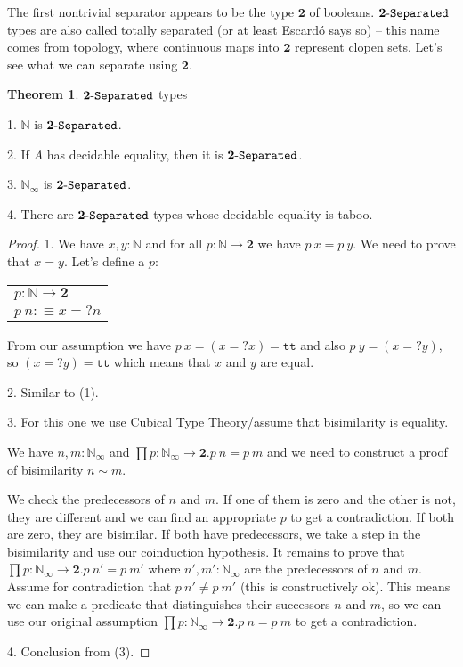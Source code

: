 \documentclass[11pt]{article}
\theoremstyle{definition}
\newtheorem{theorem}{Theorem}[section]
\newcommand{\txt}[1]{\texttt{#1}}
\renewcommand{\(}{\left(}
\renewcommand{\)}{\right)}
\newcommand{\defn}{:\equiv}
\newcommand{\apl}[2]{#1\ #2}
\newcommand{\Bool}{\mathbf{2}}
\newcommand{\true}{\txt{tt}}
\newcommand{\Nat}{\mathbb{N}}
\newcommand{\Conat}{\mathbb{N}_\infty}
\newcommand{\dprod}[2]{\prod #1.#2}
\begin{document}
The first nontrivial separator appears to be the type $\Bool$ of booleans. $\Separated{\Bool}$ types are also called totally separated (or at least Escard\'{o} says so) -- this name comes from topology, where continuous maps into $\Bool$ represent clopen sets. Let's see what we can separate using $\Bool$.

\begin{theorem} $\Separated{\Bool}$ types

1. $\Nat$ is $\Separated{\Bool}$.

2. If $A$ has decidable equality, then it is $\Separated{\Bool}$.

3. $\Conat$ is $\Separated{\Bool}$.

4. There are $\Separated{\Bool}$ types whose decidable equality is taboo.

\end{theorem}
\begin{proof}
1. We have $x, y : \Nat$ and for all $p : \Nat \to \Bool$ we have $\apl{p}{x} = \apl{p}{y}$. We need to prove that $x = y$. Let's define a $p$:

\begin{center}
\begin{tabular}{l}
$p : \Nat \to \Bool$ \\
$\apl{p}{n} \defn x =? n$
\end{tabular}
\end{center}

From our assumption we have $\apl{p}{x} = (x =? x) = \true$ and also $\apl{p}{y} = (x =? y)$, so $(x =? y) = \true$ which means that $x$ and $y$ are equal.

2. Similar to (1).

3. For this one we use Cubical Type Theory/assume that bisimilarity is equality.

We have $n, m : \Conat$ and $\dprod{p : \Conat \to \Bool}{\apl{p}{n} = \apl{p}{m}}$ and we need to construct a proof of bisimilarity $n \sim m$.

We check the predecessors of $n$ and $m$. If one of them is zero and the other is not, they are different and we can find an appropriate $p$ to get a contradiction. If both are zero, they are bisimilar. If both have predecessors, we take a step in the bisimilarity and use our coinduction hypothesis. It remains to prove that $\dprod{p : \Conat \to \Bool}{\apl{p}{n'} = \apl{p}{m'}}$ where $n', m' : \Conat$ are the predecessors of $n$ and $m$. Assume for contradiction that $\apl{p}{n'} \neq \apl{p}{m'}$ (this is constructively ok). This means we can make a predicate that distinguishes their successors $n$ and $m$, so we can use our original assumption $\dprod{p : \Conat \to \Bool}{\apl{p}{n} = \apl{p}{m}}$ to get a contradiction.

4. Conclusion from (3).

\end{proof}
\end{document}
